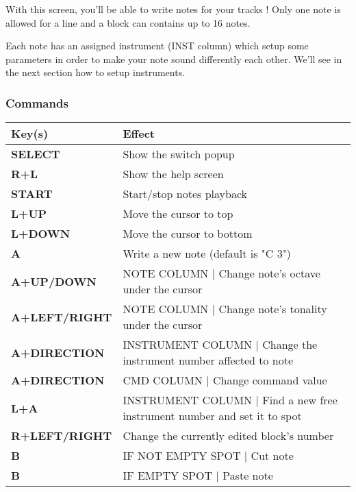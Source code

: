 With this screen, you'll be able to write notes for your tracks !
Only one note is allowed for a line and a block can contains up to 16 notes.
\medskip

Each note has an assigned instrument (INST column) which setup some parameters in order to make your note sound differently each other.
We'll see in the next section how to setup instruments.


\subsubsection{Commands}
\tablelasttail{\hline}
\begin{tabular}{|l|p{11cm}|}
\hline
    \rowcolor{headertab} {\bf Key(s)} & {\bf Effect} \\
    \hline
    {\bf SELECT} & Show the switch popup \\
    \hline
    {\bf R+L} & Show the help screen \\
    \hline
    {\bf START} & Start/stop notes playback \\
    \hline
    {\bf L+UP} & Move the cursor to top \\
    \hline
    {\bf L+DOWN} & Move the cursor to bottom \\
    \hline
    {\bf A} & Write a new note (default is "C 3") \\
    \hline
    {\bf A+UP/DOWN} & NOTE COLUMN | Change note's octave under the cursor \\
    \hline
    {\bf A+LEFT/RIGHT} & NOTE COLUMN | Change note's tonality under the cursor \\
    \hline
    {\bf A+DIRECTION} & INSTRUMENT COLUMN | Change the instrument number affected to note \\
    \hline
    {\bf A+DIRECTION} & CMD COLUMN | Change command value \\
    \hline
    {\bf L+A} & INSTRUMENT COLUMN | Find a new free instrument number and set it to spot \\
    \hline
    {\bf R+LEFT/RIGHT} & Change the currently edited block's number \\
    \hline
    {\bf B} & IF NOT EMPTY SPOT | Cut note \\
    \hline
    {\bf B} & IF EMPTY SPOT | Paste note \\
\end{tabular}
